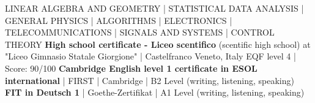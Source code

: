 \begin{scholarship}
					{LINEAR ALGEBRA AND GEOMETRY | STATISTICAL DATA ANALYSIS | GENERAL PHYSICS | ALGORITHMS | ELECTRONICS | TELECOMMUNICATIONS | SIGNALS AND SYSTEMS | CONTROL THEORY
	                }
					{\textbf{High school certificate - 
					Liceo scentifico} (scentific high school)
					}
	\scholarshipentry{}
	                {at "Liceo Gimnasio Statale Giorgione" |  Castelfranco Veneto, Italy}
	\scholarshipentry{}
	                {EQF level 4 | Score: 90/100}
	                {\textbf{Cambridge English level 1 certificate in ESOL international} | FIRST | Cambridge | B2 Level (writing, listening, speaking)
	                }
	                {\textbf{FIT in Deutsch 1} | Goethe-Zertifikat | A1 Level (writing, listening, speaking)
	                }
\end{scholarship}